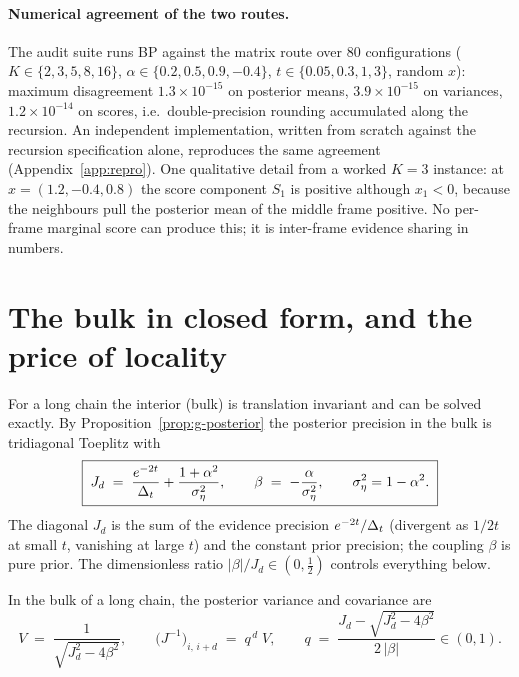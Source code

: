 \paragraph{Numerical agreement of the two routes.} The audit suite runs BP
against the matrix route over $80$ configurations
($K \in \{2,3,5,8,16\}$, $\alpha \in \{0.2, 0.5, 0.9, -0.4\}$,
$t \in \{0.05, 0.3, 1, 3\}$, random $x$): maximum disagreement
$1.3 \times 10^{-15}$ on posterior means, $3.9 \times 10^{-15}$ on
variances, $1.2 \times 10^{-14}$ on scores, i.e.\ double-precision
rounding accumulated along the recursion. An independent implementation,
written from scratch against the recursion specification alone,
reproduces the same agreement (Appendix~\ref{app:repro}). One qualitative
detail from a worked $K = 3$ instance: at $x = (1.2, -0.4, 0.8)$ the score
component $S_1$ is positive although $x_1 < 0$, because the neighbours
pull the posterior mean of the middle frame positive. No per-frame
marginal score can produce this; it is inter-frame evidence sharing in
numbers.

\section{The bulk in closed form, and the price of locality}
\label{sec:g-bulk}\label{sec:g-locality}\label{sec:bp-truncation}

For a long chain the interior (bulk) is translation invariant and can be
solved exactly. By Proposition~\ref{prop:g-posterior} the posterior
precision in the bulk is tridiagonal Toeplitz with
\begin{equation}
  \boxed{\;
  J_d \;=\; \frac{e^{-2t}}{\Delta_t} + \frac{1+\alpha^2}{\sigma_\eta^2},
  \qquad
  \beta \;=\; -\frac{\alpha}{\sigma_\eta^2},
  \qquad \sigma_\eta^2 = 1 - \alpha^2 .
  \;}
  \label{eq:g-bulk-params}
\end{equation}
The diagonal $J_d$ is the sum of the evidence precision $e^{-2t}/\Delta_t$
(divergent as $1/2t$ at small $t$, vanishing at large $t$) and the
constant prior precision; the coupling $\beta$ is pure prior. The
dimensionless ratio $|\beta|/J_d \in (0, \tfrac{1}{2})$ controls
everything below.

\begin{theorem}
\label{thm:g-bulk-cov}
In the bulk of a long chain, the posterior variance and covariance are
\begin{equation}
  \boxed{\;
  V \;=\; \frac{1}{\sqrt{J_d^2 - 4\beta^2}},
  \qquad
  \big( J^{-1} \big)_{i,\, i+d} \;=\; q^{\,d}\; V,
  \qquad
  q \;=\; \frac{J_d - \sqrt{J_d^2 - 4\beta^2}}{2\,|\beta|} \in (0, 1).
  \;}
  \label{eq:g-bulk-cov}
\end{equation}
\end{theorem}

